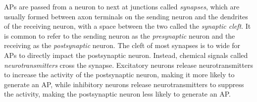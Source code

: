 APs are passed from a neuron to next at junctions called \textit{synapses}, which are usually formed between axon terminals on the sending neuron and the dendrites of the receiving neuron, with a space between the two called the \textit{synaptic cleft}. It is common to refer to the sending neuron as the \textit{presynaptic} neuron and the receiving as the \textit{postsynaptic} neuron. The cleft of most synapses is to wide for APs to directly impact the postsynaptic neuron. Instead, chemical signals called \textit{neurotransmitters} cross the synapse. Excitatory neurons release neurotransmitters to increase the activity of the postsynaptic neuron, making it more likely to generate an AP,  while inhibitory neurons release neurotransmitters to suppress the activity, making the postsynaptic neuron less likely to generate an AP.
